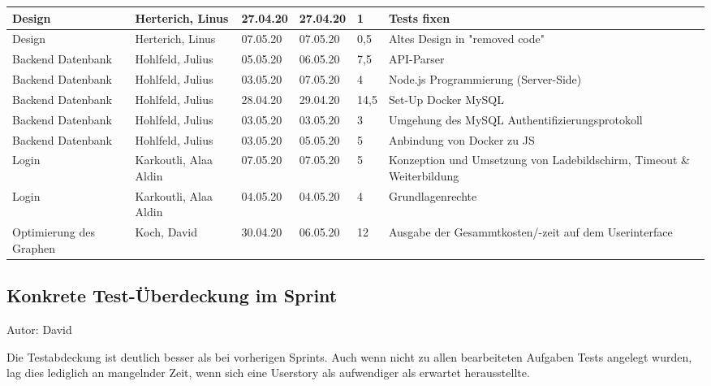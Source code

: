 \begin{longtable}{|p{4cm}|p{2cm}|p{1.2cm}|p{1.2cm}|p{0.7cm}|p{3.8cm}|}
  \hline
  Design                                                                & Herterich, Linus      & 27.04.20 & 27.04.20 & 1     & Tests fixen \\
  \hline
  Design                                                                & Herterich, Linus      & 07.05.20 & 07.05.20 & 0,5   & Altes Design in "removed code" \\
  \hline
  Backend Datenbank                                                     & Hohlfeld, Julius      & 05.05.20 & 06.05.20 & 7,5   & API-Parser \\
  \hline
  Backend Datenbank                                                     & Hohlfeld, Julius      & 03.05.20 & 07.05.20 & 4     & Node.js Programmierung (Server-Side) \\
  \hline
  Backend Datenbank                                                     & Hohlfeld, Julius      & 28.04.20 & 29.04.20 & 14,5  & Set-Up Docker MySQL \\
  \hline
  Backend Datenbank                                                     & Hohlfeld, Julius      & 03.05.20 & 03.05.20 & 3     & Umgehung des MySQL Authentifizierungsprotokoll \\
  \hline
  Backend Datenbank                                                     & Hohlfeld, Julius      & 03.05.20 & 05.05.20 & 5     & Anbindung von Docker zu JS \\
  \hline
  Login                                                                 & Karkoutli, Alaa Aldin & 07.05.20 & 07.05.20 & 5     & Konzeption und Umsetzung von Ladebildschirm, Timeout \& Weiterbildung \\
  \hline
  Login                                                                 & Karkoutli, Alaa Aldin & 04.05.20 & 04.05.20 & 4     & Grundlagenrechte \\
  \hline
  Optimierung des Graphen                                               & Koch, David           & 30.04.20 & 06.05.20 & 12    & Ausgabe der Gesammtkosten/-zeit auf dem Userinterface \\
\end{longtable}

\subsection{Konkrete Test-Überdeckung im Sprint}
{\small Autor: David}

Die Testabdeckung ist deutlich besser als bei vorherigen Sprints. Auch wenn nicht zu allen bearbeiteten Aufgaben Tests angelegt wurden, lag dies lediglich an mangelnder Zeit, wenn sich eine Userstory als aufwendiger als erwartet herausstellte.

